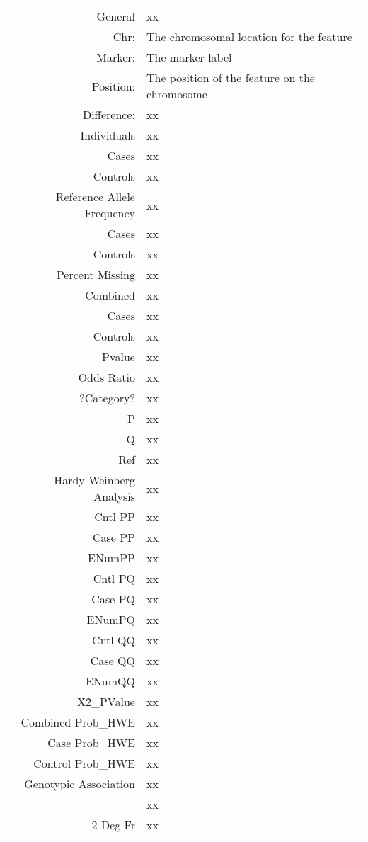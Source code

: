 \begin{supertabular}{r p{5in}}
  General & xx ~ \\
    Chr: & The chromosomal location for the feature \\
    Marker: & The marker label \\
    Position: & The position of the feature on the chromosome \\
    Difference: & xx \\ [1em]
  Individuals & xx ~ \\
    Cases  & xx  \\
    Controls  & xx  \\ [1em]
  Reference Allele Frequency & xx \\
    Cases  & xx  \\
    Controls  & xx  \\ [1em]
  Percent Missing & xx  \\
    Combined  & xx  \\
    Cases  & xx  \\
    Controls  & xx  \\
    Pvalue  & xx  \\
    Odds Ratio  & xx  \\ [1em]
    ?Category? & xx  \\
    P  & xx  \\
    Q  & xx  \\
    Ref  & xx  \\ [1em]
  Hardy-Weinberg Analysis & xx ~ \\ [1em]
    Cntl PP  & xx  \\
    Case PP  & xx  \\
    ENumPP  & xx  \\
    Cntl PQ  & xx  \\
    Case PQ  & xx  \\
    ENumPQ  & xx  \\
    Cntl QQ  & xx  \\
    Case QQ  & xx  \\
    ENumQQ  & xx  \\
    X\^2\_PValue  & xx  \\
    Combined Prob\_HWE  & xx  \\
    Case Prob\_HWE  & xx  \\
    Control Prob\_HWE  & xx  \\ [1em]
  Genotypic Association & xx ~ \\
  ~ & xx ~ \\
  2 Deg Fr & xx ~ \\

\end{supertabular}
